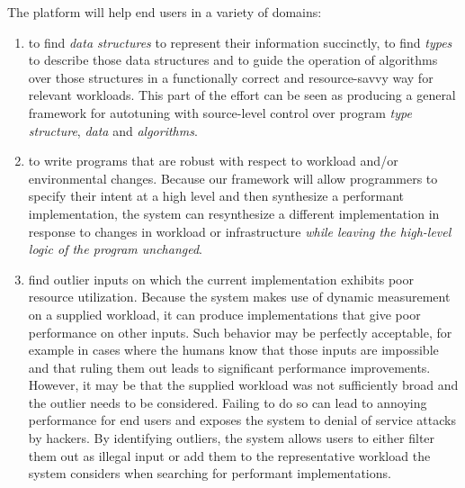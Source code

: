 The \rasp{} platform will help end users in a variety of domains:
\begin{enumerate}
\item to find \emph{data structures} to represent their information succinctly,
      to find \emph{types} to describe those data structures and to
      guide the operation of algorithms over those structures
      in a functionally correct and resource-savvy way for
  relevant workloads.  This part of the effort can be seen as producing
  a general framework for autotuning with source-level control over
  program \emph{type structure}, \emph{data} and \emph{algorithms}.
\item to write programs that are robust with respect to workload and/or
  environmental
  changes.  Because our framework will allow programmers to specify their
  intent at a high level and then synthesize a performant
  implementation, the system can resynthesize a
  different implementation in response to changes in workload or
  infrastructure
  \textit{while leaving the high-level logic of the program unchanged}.
\item find outlier inputs on which the current implementation exhibits
  poor resource utilization.  Because the system makes use of dynamic
  measurement on a supplied workload, it can produce implementations
  that give poor performance on other inputs.  Such behavior may be
  perfectly acceptable, for example in cases where the humans know that
  those inputs are impossible and that ruling them out leads to
  significant performance improvements.  However, it may be that the
  supplied workload was not sufficiently broad and the outlier needs
  to be considered.  Failing to do so can lead to annoying performance
  for end users and exposes the system to denial of service attacks
  by hackers.   By identifying outliers, the system allows users to
  either filter them out as illegal input or add them to the
  representative workload the system considers when searching for
  performant implementations.
\end{enumerate}






